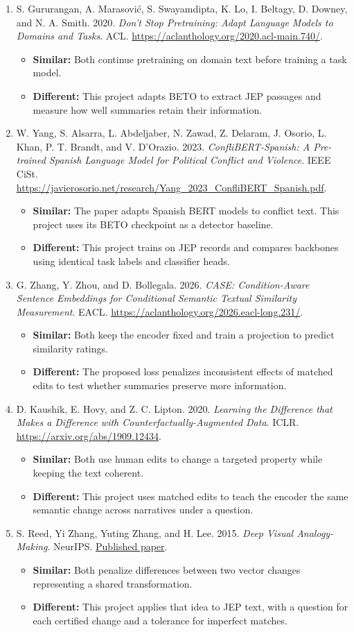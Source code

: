 \documentclass[11pt,letterpaper]{article}
\newcommand{\paperentry}[3]{\item\relax #1
\begin{itemize}\item \textbf{Similar:} #2
\item \textbf{Different:} #3\end{itemize}\vspace{5pt}}
\begin{document}
\begin{enumerate}[label=\textbf{\arabic*.},leftmargin=*]
\paperentry{S. Gururangan, A. Marasovi\'{c}, S. Swayamdipta, K. Lo, I. Beltagy, D. Downey, and N. A. Smith. 2020. \emph{Don't Stop Pretraining: Adapt Language Models to Domains and Tasks}. ACL. \url{https://aclanthology.org/2020.acl-main.740/}.} %
{Both continue pretraining on domain text before training a task model.}
{This project adapts BETO to extract JEP passages and measure how well summaries retain their information.}

\paperentry{W. Yang, S. Alsarra, L. Abdeljaber, N. Zawad, Z. Delaram, J. Osorio, L. Khan, P. T. Brandt, and V. D'Orazio. 2023. \emph{ConfliBERT-Spanish: A Pre-trained Spanish Language Model for Political Conflict and Violence}. IEEE CiSt. \url{https://javierosorio.net/research/Yang_2023_ConfliBERT_Spanish.pdf}.}
{The paper adapts Spanish BERT models to conflict text. This project uses its BETO checkpoint as a detector baseline.}
{This project trains on JEP records and compares backbones using identical task labels and classifier heads.}

\paperentry{G. Zhang, Y. Zhou, and D. Bollegala. 2026. \emph{CASE: Condition-Aware Sentence Embeddings for Conditional Semantic Textual Similarity Measurement}. EACL. \url{https://aclanthology.org/2026.eacl-long.231/}.}
{Both keep the encoder fixed and train a projection to predict similarity ratings.}
{The proposed loss penalizes inconsistent effects of matched edits to test whether summaries preserve more information.}

\paperentry{D. Kaushik, E. Hovy, and Z. C. Lipton. 2020. \emph{Learning the Difference that Makes a Difference with Counterfactually-Augmented Data}. ICLR. \url{https://arxiv.org/abs/1909.12434}.}
{Both use human edits to change a targeted property while keeping the text coherent.}
{This project uses matched edits to teach the encoder the same semantic change across narratives under a question.}

\paperentry{S. Reed, Yi Zhang, Yuting Zhang, and H. Lee. 2015. \emph{Deep Visual Analogy-Making}. NeurIPS. \href{https://proceedings.neurips.cc/paper_files/paper/2015/file/e07413354875be01a996dc560274708e-Paper.pdf}{Published paper}.}
{Both penalize differences between two vector changes representing a shared transformation.}
{This project applies that idea to JEP text, with a question for each certified change and a tolerance for imperfect matches.}
\end{enumerate}
\end{document}
